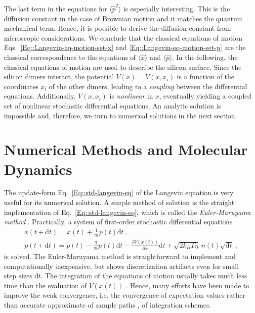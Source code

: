 	The last term in the equations for $\langle \hat{p}^2 \rangle$ is especially interesting. This is the diffusion constant in the case of Brownian motion and it matches the quantum mechanical term. Hence, it is possible to derive the diffusion constant from microscopic considerations. We conclude that the classical equations of motion Eqs.~\eqref{Eq::Langevin-eq-motion-set-x} and \eqref{Eq::Langevin-eq-motion-set-p} are the classical correspondence to the equations of $\langle \hat{x} \rangle$ and $\langle \hat{p} \rangle$. In the following, the classical equations of motion are used to describe the silicon surface. Since the silicon dimers interact, the potential $V(x) =	V(x, {x_i})$ is a function of the coordinates $x_i$ of the other dimers, leading to a \textit{coupling} between the differential equations. Additionally, $V(x, {x_i})$ is \textit{nonlinear} in $x$, eventually yielding a coupled set of nonlinear stochastic differential equations. An analytic solution is impossible and, therefore, we turn to numerical solutions in the next section.
	\section{Numerical Methods and Molecular Dynamics} \label{Section::Numerical-methods}
	The update-form Eq.~\eqref{Eq::std-langevin-eq} of the Langevin equation is very useful for its numerical solution. A simple method of solution is the straight implementation of Eq.~\eqref{Eq::std-langevin-eq}, which is called the \textit{Euler-Maruyama method} \cite{kloeden1992stochastic}. Practically, a system of first-order stochastic differential equations
	\begin{align}
		&x(t + \text{d}t) = x(t)	+ \frac{1}{m} p(t) \text{d}t ~, \\
		&p(t + \text{d}t) =	p(t) - \frac{\eta}{m} p(t) \text{d}t - \frac{\partial V(x(t))}{\partial x} \text{d}t + \sqrt{2 k_B T \eta} ~ n(t) \sqrt{\text{d}t} ~,
	\end{align}
	is solved. The Euler-Maruyama method is straightforward to implement and computationally inexpensive, but shows discretization artifacts even for small step sizes $\text{d}t$. The integration of the equations of motion usually takes much less time than the evaluation of $V(x(t))$ \cite{frenkel2023understanding}. Hence, many efforts have been made to improve the weak convergence, i.e. the convergence of expectation values rather than accurate approximate of sample paths \cite{kloeden1992stochastic}, of integration schemes. \\
	
